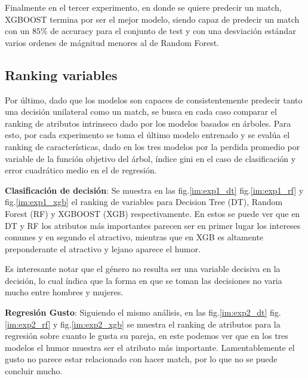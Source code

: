 Finalmente en el tercer experimento, en donde se quiere predecir un match, XGBOOST termina por ser el mejor modelo, siendo capaz de predecir un match con un $85\%$ de accuracy para el conjunto de test y con una desviación estándar varios ordenes de mágnitud menores al de Random Forest.


\subsection{Ranking variables}
Por último, dado que los modelos son capaces de consistentemente predecir tanto una decisión unilateral como un match, se busca en cada caso comparar el ranking de atributos intrinseco dado por los modelos basados en árboles. Para esto, por cada experimento se toma el último modelo entrenado y se evalúa el ranking de características, dado en los tres modelos por la perdida promedio por variable de la función objetivo del árbol, índice gini en el caso de clasificación y error cuadrático medio en el de regresión.

\textbf{Clasificación de decisión}: Se muestra en las fig.\ref{im:exp1_dt} fig.\ref{im:exp1_rf} y fig.\ref{im:exp1_xgb} el ranking de variables para Decision Tree (DT), Random Forest (RF) y XGBOOST (XGB) respectivamente. En estos se puede ver que en DT y RF los atributos más importantes parecen ser en primer lugar los intereses comunes y en segundo el atractivo, mientras que en XGB es altamente preponderante el atractivo y lejano aparece el humor.

Es interesante notar que el género no resulta ser una variable decisiva en la decisión, lo cual índica que la forma en que se toman las decisiones no varia mucho entre hombres y mujeres.




\textbf{Regresión Gusto}: Siguiendo el mismo análisis, en las fig.\ref{im:exp2_dt} fig.\ref{im:exp2_rf} y fig.\ref{im:exp2_xgb} se muestra el ranking de atributos para la regresión sobre cuanto le gusta su pareja, en este podemos ver que en los tres modelos el humor muestra ser el atributo más importante. Lamentablemente el gusto no parece estar relacionado con hacer match, por lo que no se puede concluir mucho.

